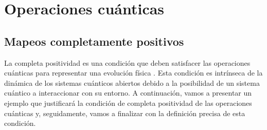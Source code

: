 \chapter{Operaciones cuánticas} %



\section{Mapeos completamente positivos}
%

La completa positividad es una condición que deben satisfacer las operaciones
cuánticas para representar una evolución física 
\cite{bengtsson_zyczkowski_2017}. Esta condición es
intrínseca de la dinámica de los sistemas cuánticos abiertos debido a la 
posibilidad de un sistema cuántico a interaccionar con su entorno. A
continuación, vamos a presentar un ejemplo que justificará la condición
de completa positividad de las operaciones cuánticas y, seguidamente,
vamos a finalizar con la definición precisa de esta condición.

